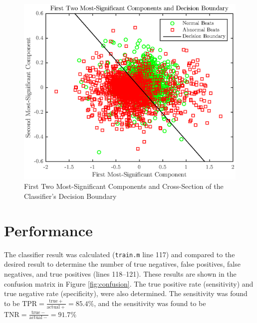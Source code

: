 \documentclass[titlepage,12pt,letter]{article}
\begin{document}
\begin{figure}[hbtp]
    \centering
    \includegraphics[height=0.42\textheight]{../figures/train_05}
    \caption{First Two Most-Significant Components and Cross-Section of the
    Classifier's Decision Boundary}
    \label{fig:classifier}
\end{figure}

\section{Performance} 
The classifier result was calculated (\verb`train.m` line 117) and compared to
the desired result to determine the number of true negatives, false positives,
false negatives, and true positives (lines 118--121).  These results are shown
in the confusion matrix in Figure \ref{fig:confusion}. The true positive rate
(sensitivity) and true negative rate (specificity), were also determined.  The
sensitivity was found to be $\mathrm{TPR} = \frac{\mathrm{true}
+}{\mathrm{actual} +} = 85.4\%$, and the sensitivity was found to be
$\mathrm{TNR} = \frac{\mathrm{true} -}{\mathrm{actual} -} = 91.7\%$
\end{document}
